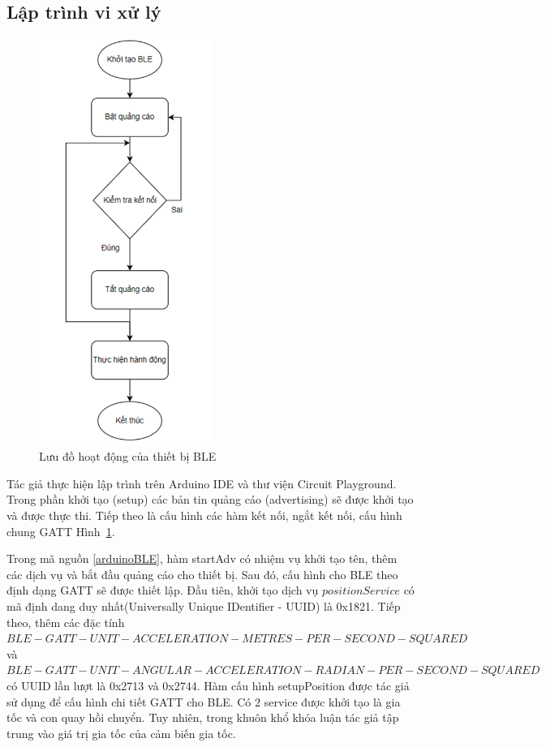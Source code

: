 \subsection{Lập trình vi xử lý}

\begin{figure}[!]
		\centering
 		\includegraphics[width=0.5\textwidth]{images/flowBLE.png}
		\caption{Lưu đồ hoạt động của thiết bị BLE}
		\label{flowBLE}
\end{figure}




Tác giả thực hiện lập trình trên Arduino IDE và thư viện Circuit Playground. Trong phần khởi tạo (setup) các bản tin quảng cáo (advertising) sẽ được khởi tạo và được thực thi. Tiếp theo là cấu hình các hàm kết nối, ngắt kết nối, cấu hình chung \gls{GATT} Hình~\ref{flowBLE}.



Trong mã nguồn \ref{arduinoBLE}, hàm startAdv có nhiệm vụ khởi tạo tên, thêm các dịch vụ và bắt đầu quảng cáo cho thiết bị. Sau đó, cấu hình cho \gls{BLE} theo định dạng \gls{GATT} sẽ được thiết lập. Đầu tiên, khởi tạo dịch vụ $positionService$ có mã định dang duy nhất(Universally Unique IDentifier - UUID) là 0x1821. Tiếp theo, thêm các đặc tính $BLE-GATT-UNIT-ACCELERATION
-METRES-PER-SECOND-SQUARED
$ và $BLE-GATT-UNIT-ANGULAR-ACCELERATION
-RADIAN-PER-SECOND-SQUARED
$ có UUID lần lượt là 0x2713 và 0x2744. Hàm cấu hình setupPosition được tác giả sử dụng để cấu hình chi tiết GATT cho BLE. Có 2 service được khởi tạo là gia tốc và con quay hồi chuyển. Tuy nhiên, trong khuôn khổ khóa luận tác giả tập trung vào giá trị gia tốc của cảm biến gia tốc. 


